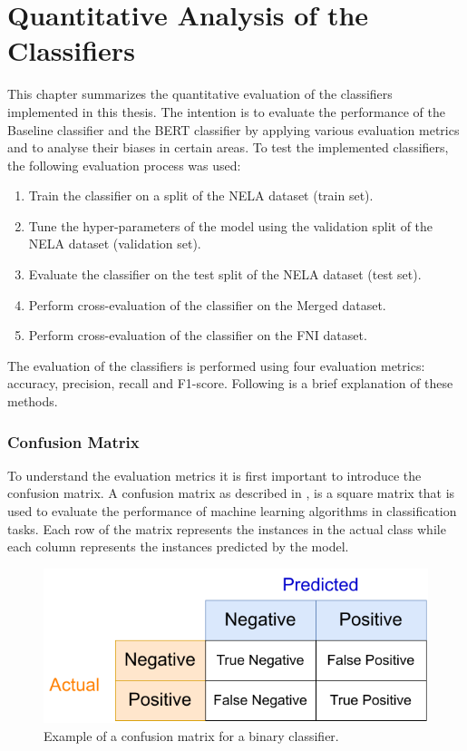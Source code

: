 \chapter{Quantitative Analysis of the Classifiers}
\label{experiments}
This chapter summarizes the quantitative evaluation of the classifiers implemented in this thesis. The intention is to evaluate the performance of the Baseline classifier and the BERT classifier by applying various evaluation metrics and to analyse their biases in certain areas. To test the implemented classifiers, the following evaluation process was used:

\begin{enumerate}
    \item Train the classifier on a split of the NELA dataset (train set).
    \item Tune the hyper-parameters of the model using the validation split of the NELA dataset (validation set).
    \item Evaluate the classifier on the test split of the NELA dataset (test set).
    \item Perform cross-evaluation of the classifier on the Merged dataset.
    \item Perform cross-evaluation of the classifier on the FNI dataset.
\end{enumerate}

The evaluation of the classifiers is performed using four evaluation metrics: accuracy, precision, recall and F1-score. Following is a brief explanation of these methods.

\subsection*{Confusion Matrix}
To understand the evaluation metrics it is first important to introduce the confusion matrix. A confusion matrix as described in \cite{confusion_matrix}, is a square matrix that is used to evaluate the performance of machine learning algorithms in classification tasks. Each row of the matrix represents the instances in the actual class while each column represents the instances predicted by the model.

\begin{figure}[H]
    \centering
    \includegraphics[scale=0.9]{obrazky-figures/conf_mat2.pdf}
    \caption{Example of a confusion matrix for a binary classifier.}
    \label{fig:conf_mat}
\end{figure}

